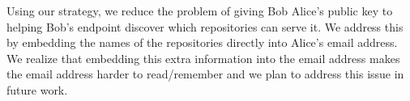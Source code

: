 Using our strategy, we reduce the problem of giving Bob Alice's public 
key to helping Bob's endpoint discover which repositories can serve it.  
We address this by embedding the names of the repositories directly into 
Alice's email address. We realize that embedding this extra information 
into the email address makes the email address harder to read/remember 
and we plan to address this issue in future work. 
